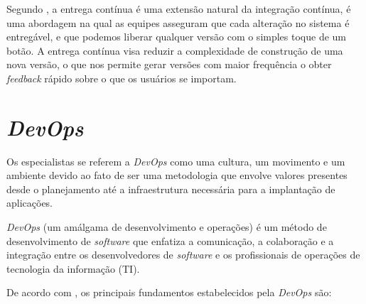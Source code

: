 \documentclass[
	12pt,				%
	openright,			%
	oneside,			%
	a4paper,			%
	english,			%
	french,				%
	spanish,			%
	brazil,				%
	]{abntex2}
\begin{document}
Segundo , a entrega contínua é uma extensão natural da integração contínua, é uma abordagem na qual as equipes asseguram que cada alteração no sistema é entregável, e que podemos liberar qualquer versão com o simples toque de um botão. A entrega contínua visa reduzir a complexidade de construção de uma nova versão, o que nos permite gerar versões com maior frequência o obter \textit{feedback} rápido sobre o que os usuários se importam.

\section{\textit{DevOps}}

Os especialistas se referem a \textit{DevOps} como uma cultura, um movimento e um ambiente devido ao fato de ser uma metodologia que envolve valores presentes desde o planejamento até a infraestrutura necessária para a implantação de aplicações.

\begin{citacao}
	\textit{DevOps} (um amálgama de desenvolvimento e operações) é um método de desenvolvimento de \textit{software} que enfatiza a comunicação, a colaboração e a integração entre os desenvolvedores de \textit{software} e os profissionais de operações de tecnologia da informação (TI).
\end{citacao}

De acordo com , os principais fundamentos estabelecidos pela \textit{DevOps} são:
\end{document}
